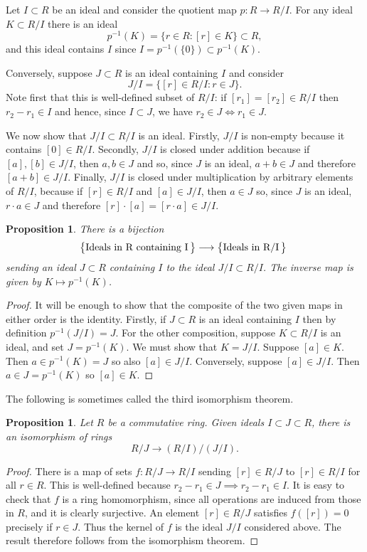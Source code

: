 \documentclass [12pt,oneside,a4paper,mathscr]{amsart}
\newtheorem{prop}[thm]{Proposition}
\theoremstyle{definition}
\begin{document}
Let $I\subset R$ be an ideal and consider  the quotient map $p\colon R \to R/I$.  For any ideal $K\subset R/I$ there is an ideal \[p^{-1}(K)=\{r\in R: [r]\in K\}\subset R,\]
and this ideal contains $I$ since $I=p^{-1}(\{0\})\subset p^{-1}(K)$.

Conversely, suppose  $J\subset R$ is an ideal containing $I$ and consider
\[J/I=\{[r]\in R/I : r\in J\}.\]
Note first that this is well-defined subset of $R/I$: if $[r_1]=[r_2]\in R/I $ then $r_2-r_1\in I$ and hence, since $I\subset J$, we have $r_2\in J \iff r_1\in J$.

We now show that $J/I\subset R/I$ is an ideal. Firstly, $J/I$ is non-empty because it contains $[0]\in R/I$. Secondly, $J/I$ is closed under addition because if $[a],[b]\in J/I$, then $a,b\in J$ and so, since $J$ is an ideal,  $a+b\in J$ and therefore $[a+b]\in J/I$. Finally, $J/I$ is closed under multiplication by arbitrary elements of $R/I$, because if $[r]\in R/I$ and $[a]\in J/I$, then $a\in J$ so, since $J$ is an ideal, $r\cdot a\in J$ and therefore $[r]\cdot[a]=[r\cdot a]\in J/I$.

\begin{prop}
\label{corr}
There is  a bijection 
\[\text{\big\{Ideals in R containing I\,\big\}} \longrightarrow \text{\big\{Ideals in R/I\,\big\} }\]
sending an ideal $J\subset R$ containing $I$ to the ideal  $J/I\subset R/I$. The inverse map is given by $K\mapsto p^{-1}(K)$.
\end{prop}

\begin{proof}
It will be enough to show that the composite of the two given maps in either order is the identity.
Firstly, if $J\subset R$ is an ideal containing $I$ then by definition $p^{-1}(J/I)=J$. For the other composition, suppose $K\subset R/I$ is an ideal, and set $J=p^{-1}(K)$.
We must show that $K=J/I$. Suppose $[a]\in K$. Then $a\in p^{-1}(K)=J$ so also $[a]\in J/I$. Conversely, suppose $[a]\in J/I$. Then $a\in J=p^{-1}(K)$ so $[a]\in K$.
\end{proof}



The following is sometimes called the third isomorphism theorem.

\begin{prop}
Let $R$ be a commutative ring. Given ideals $I\subset J\subset R$, there is an isomorphism of rings
\[R/J \to (R/I)/(J/I).\]
\end{prop}

\begin{proof}
 There is a map of sets $f\colon R/J\to R/I$ sending $[r]\in R/J$ to $[r]\in R/I$ for all $r\in R$. This  is well-defined because $r_2-r_1\in J\implies r_2-r_1\in I$. It is easy to check that $f$ is a ring homomorphism, since all operations are induced from those in $R$, and it is clearly surjective. An element $[r]\in R/J$ satisfies $f([r])=0$ precisely if $r\in J$. Thus the kernel of $f$ is the ideal $J/I$ considered above. The result therefore follows from the isomorphism theorem.
\end{proof}
\end{document}
